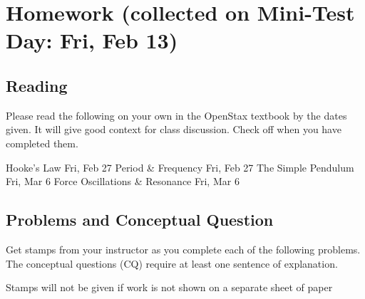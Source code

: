 \documentclass[10pt]{exam}
\title{\mytitle}
\date{\today}
\def\testday{Fri, Feb 13}
\def\one{Fri, Feb 27}
\def\two{Fri, Feb 27}
\def\four{Fri, Mar 6}
\def\seven{Fri, Mar 6}
\begin{document}
\maketitle




\section*{Homework (collected on Mini-Test Day: \testday)}



\subsection*{Reading}

Please read the following on your own in the OpenStax textbook by the dates given.  It will give good context for class discussion.  Check off when you have completed them.

\vspace{1em}

\begin{checkboxes}
   Hooke's Law \dotfill \one
   Period \& Frequency \dotfill \two
   The Simple Pendulum \dotfill \four
   Force Oscillations \& Resonance \dotfill \seven
\end{checkboxes}


\subsection*{Problems and Conceptual Question}


Get stamps from your instructor as you complete each of the following problems.  The conceptual questions (CQ) require at least one sentence of explanation.

\vspace{1em}

\noindent
{\sc Stamps will not be given if work is not shown on a separate sheet of paper}

\vspace{1em}
\end{document}
